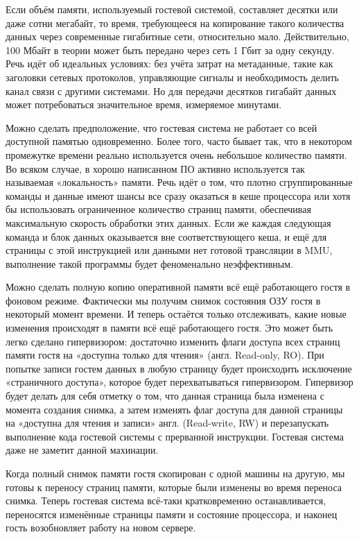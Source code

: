 \documentclass[14pt, a4paper]{article}
\begin{document}
Если объём памяти, используемый гостевой системой, составляет десятки или даже сотни мегабайт,
то время, требующееся на копирование такого количества данных через современные гигабитные
сети, относительно мало. Действительно, 100 Мбайт в теории может быть передано через сеть 1 Гбит
за одну секунду. Речь идёт об идеальных условиях: без учёта затрат на метаданные, такие как
заголовки сетевых протоколов, управляющие сигналы и необходимость делить канал связи с другими
системами. Но для передачи десятков гигабайт данных может потребоваться значительное время,
измеряемое минутами.

Можно сделать предположение, что гостевая система не работает со всей доступной памятью
одновременно. Более того, часто бывает так, что в некотором промежутке времени реально
используется очень небольшое количество памяти. Во всяком случае, в хорошо написанном ПО
активно используется так называемая «локальность» памяти. Речь идёт о том, что плотно
сгруппированные команды и данные имеют шансы все сразу оказаться в кеше процессора или хотя
бы использовать ограниченное количество страниц памяти, обеспечивая максимальную скорость
обработки этих данных. Если же каждая следующая команда и блок данных оказывается вне
соответствующего кеша, и ещё для страницы с этой инструкцией или данными нет готовой трансляции
в MMU, выполнение такой программы будет феноменально неэффективным.

Можно сделать полную копию оперативной памяти всё ещё работающего гостя в фоновом режиме.
Фактически мы получим снимок состояния ОЗУ гостя в некоторый момент времени. И теперь остаётся
только отслеживать, какие новые изменения происходят в памяти всё ещё работающего гостя. Это
может быть легко сделано гипервизором: достаточно изменить флаги доступа всех страниц памяти
гостя на «доступна только для чтения» (англ. Read-only, RO). При попытке записи гостем данных в
любую страницу будет происходить исключение «страничного доступа», которое будет
перехватываться гипервизором. Гипервизор будет делать для себя отметку о том, что данная
страница была изменена с момента создания снимка, а затем изменять флаг доступа для данной
страницы на «доступна для чтения и записи» англ. (Read-write, RW) и перезапускать выполнение кода
гостевой системы с прерванной инструкции. Гостевая система даже не заметит данной махинации.

Когда полный снимок памяти гостя скопирован с одной машины на другую, мы готовы к переносу
страниц памяти, которые были изменены во время переноса снимка. Теперь гостевая система
всё-таки кратковременно останавливается, переносятся изменённые страницы памяти и состояние
процессора, и наконец гость возобновляет работу на новом сервере.
\end{document}
